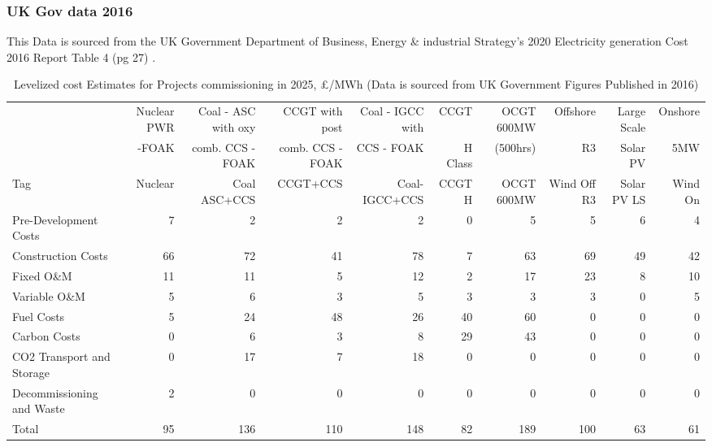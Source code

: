\documentclass[11pt]{article}
\numberwithin{equation}{section}
\begin{document}
\subsubsection{UK Gov data 2016}
\label{sec:org4e9e0cd}
This Data is sourced from the UK Government Department of Business, Energy \& industrial Strategy's 2020 Electricity generation Cost 2016 Report Table 4 (pg 27) \cite{DeptEnerLCOE2016}.
\begin{table}
\caption{\label{tabLCOEBreakdownGov2016}Levelized cost Estimates for Projects commissioning in 2025, £/MWh (Data is sourced from UK Government Figures Published in 2016\cite{DeptEnerLCOE})}
\centering
\tiny
\begin{tabular}{lrrrrrrrrr}
\toprule
 & Nuclear PWR & Coal - ASC with oxy & CCGT with post & Coal - IGCC with & CCGT & OCGT 600MW & Offshore & Large Scale & Onshore\\
 & -FOAK & comb. CCS -FOAK & comb. CCS - FOAK & CCS - FOAK & H Class & (500hrs) & R3 & Solar PV & 5MW\\
\midrule
Tag & Nuclear & Coal ASC+CCS & CCGT+CCS & Coal-IGCC+CCS & CCGT H & OCGT 600MW & Wind Off R3 & Solar PV LS & Wind On\\
Pre-Development Costs & 7 & 2 & 2 & 2 & 0 & 5 & 5 & 6 & 4\\
Construction Costs & 66 & 72 & 41 & 78 & 7 & 63 & 69 & 49 & 42\\
Fixed O\&M & 11 & 11 & 5 & 12 & 2 & 17 & 23 & 8 & 10\\
Variable O\&M & 5 & 6 & 3 & 5 & 3 & 3 & 3 & 0 & 5\\
Fuel Costs & 5 & 24 & 48 & 26 & 40 & 60 & 0 & 0 & 0\\
Carbon Costs & 0 & 6 & 3 & 8 & 29 & 43 & 0 & 0 & 0\\
CO2 Transport and Storage \footnotemark & 0 & 17 & 7 & 18 & 0 & 0 & 0 & 0 & 0\\
Decommissioning and Waste & 2 & 0 & 0 & 0 & 0 & 0 & 0 & 0 & 0\\
Total & 95 & 136 & 110 & 148 & 82 & 189 & 100 & 63 & 61\\
\bottomrule
\end{tabular}
\end{table}
\end{document}
